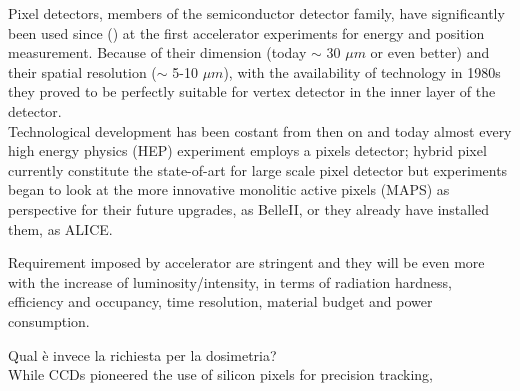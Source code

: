 Pixel detectors, members of the semiconductor detector family, have significantly been used since () at the first accelerator experiments for energy and position measurement.
Because of their dimension (today $\sim$ 30 $\mu m$ or even better) and their spatial resolution ($\sim$ 5-10 $\mu m$), with the availability of technology in 1980s they proved to be perfectly suitable for vertex detector in the inner layer of the detector.\\
Technological development has been costant from then on and today almost every high energy physics (HEP) experiment employs a pixels detector; hybrid pixel currently constitute the state-of-art for large scale pixel detector but experiments began to look at the more innovative monolitic active pixels (MAPS) as perspective for their future upgrades, as BelleII, or they already have installed them, as ALICE.

Requirement imposed by accelerator are stringent and they will be even more with the increase of luminosity/intensity, in terms of radiation hardness, efficiency and occupancy, time resolution, material budget and power consumption.

Qual è invece la richiesta per la dosimetria? \\



While CCDs pioneered the use of silicon pixels for precision tracking, 